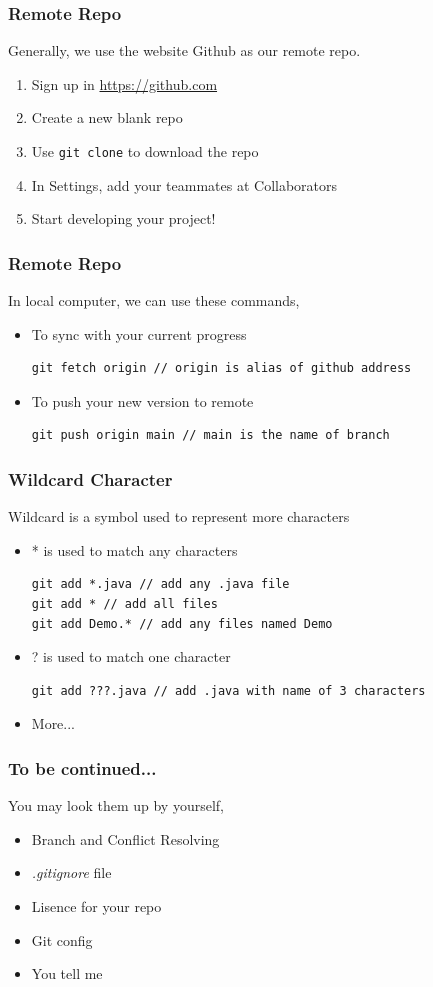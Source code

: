 \documentclass{beamer}
\begin{document}
\begin{frame}
    \frametitle{Remote Repo}
Generally, we use the website Github as our remote repo.
\begin{enumerate}
    \item Sign up in \url{https://github.com}
    \item Create a new blank repo
    \item Use \lstinline|git clone| to download the repo
    \item In Settings, add your teammates at Collaborators
    \item Start developing your project!
\end{enumerate}
\end{frame}

\begin{frame}[fragile]
    \frametitle{Remote Repo}
In local computer, we can use these commands,
\begin{itemize}
    \item To sync with your current progress
    \begin{lstlisting}[morekeywords=git]
git fetch origin // origin is alias of github address
    \end{lstlisting}
    \item To push your new version to remote
    \begin{lstlisting}[morekeywords=git]
git push origin main // main is the name of branch
    \end{lstlisting}
\end{itemize}
\end{frame}

\begin{frame}[fragile]
    \frametitle{Wildcard Character}
Wildcard is a symbol used to represent more characters
\begin{itemize}
    \item * is used to match any characters
    \begin{lstlisting}[morekeywords=git]
git add *.java // add any .java file
git add * // add all files
git add Demo.* // add any files named Demo
    \end{lstlisting}
    \item ? is used to match one character
    \begin{lstlisting}[morekeywords=git]
git add ???.java // add .java with name of 3 characters
    \end{lstlisting}
    \item More...
\end{itemize}
\end{frame}

\begin{frame}
    \frametitle{To be continued...}
You may look them up by yourself, 
\begin{itemize}
    \item Branch and Conflict Resolving
    \item \textit{.gitignore} file
    \item Lisence for your repo
    \item Git config
    \item You tell me
\end{itemize}
\end{frame}
\end{document}
